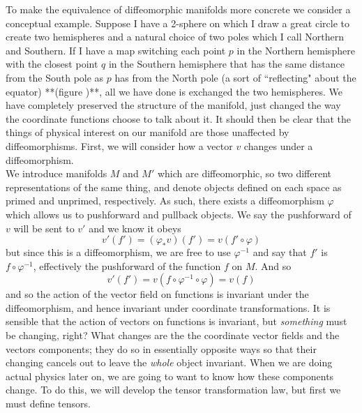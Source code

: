   To make the equivalence of diffeomorphic manifolds more concrete we consider a conceptual example.  Suppose I have a 2-sphere on which I draw a great circle to create two hemispheres and a natural choice of two poles which I call Northern and Southern.  If I have a map switching each point $p$ in the Northern hemisphere with the closest point $q$ in the Southern hemisphere that has the same distance from the South pole as $p$ has from the North pole (a sort of ``reflecting" about the equator) **(figure )**, all we have done is exchanged the two hemispheres.  We have completely preserved the structure of the manifold, just changed the way the coordinate functions choose to talk about it.  It should then be clear that the things of physical interest on our manifold are those unaffected by diffeomorphisms.  First, we will consider how a vector $v$ changes under a diffeomorphism.\\
  
  We introduce manifolds $M$ and $M'$ which are diffeomorphic, so two different representations of the same thing, and denote objects defined on each space as primed and unprimed, respectively.  As such, there exists a diffeomorphism $\varphi$ which allows us to pushforward and pullback objects.  We say the pushforward of $v$  will be sent to $v'$ and we know it obeys
  \begin{equation*}
  	v'(f') = (\varphi_* v)(f') = v(f'\circ \varphi)
  \end{equation*} 
  but since this is a diffeomorphism, we are free to use $\varphi^{-1}$ and say that $f'$ is $f\circ \varphi^{-1}$, effectively the pushforward of the function $f$ on $M$. And so
  \begin{equation*}
  	v'(f') = v(f\circ \varphi^{-1}\circ \varphi) = v(f)
  \end{equation*}
  and so the action of the vector field on functions is invariant under the diffeomorphism, and hence invariant under coordinate transformations.  It is sensible that the action of vectors on functions is invariant, but \textit{something} must be changing, right?  What changes are the the coordinate vector fields and the vectors components; they do so in essentially opposite ways so that their changing cancels out to leave the \textit{whole} object invariant.  When we are doing actual physics later on, we are going to want to know how these components change.  To do this, we will develop the tensor transformation law, but first we must define tensors.
  
